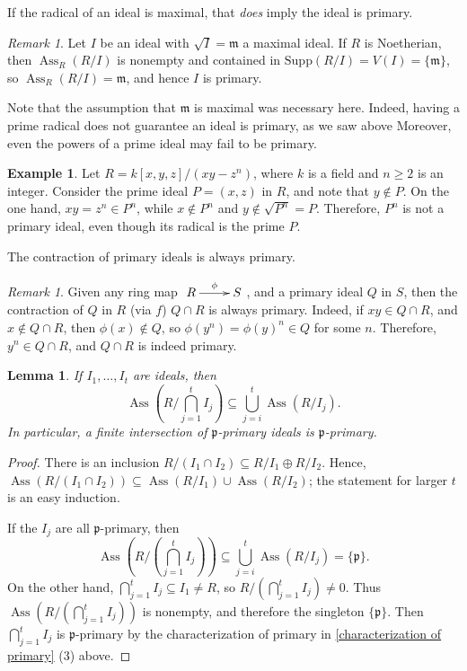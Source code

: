 \documentclass{amsart}[12pt]
\def\Ass{\operatorname{Ass}}
\newcommand{\p}{{\mathfrak p}}
\newcommand{\fm}{{\mathfrak m}}
\numberwithin{equation}{section}
\theoremstyle{plain} %
\newtheorem{lemma}[equation]{Lemma}
\theoremstyle{definition}
\newtheorem{example}[equation]{Example}
\theoremstyle{remark}
\newtheorem{remark}[equation]{Remark}
\newcommand{\Supp}{\mathrm{Supp}}
\begin{document}
If the radical of an ideal is maximal, that \emph{does} imply the ideal is primary.

\begin{remark} 
Let $I$ be an ideal with $\sqrt{I}=\fm$ a maximal ideal. If $R$ is Noetherian, then $\Ass_R(R/I)$ is nonempty and contained in $\Supp(R/I)=V(I)=\{\fm\}$, so $\Ass_R(R/I) =\fm$, and hence $I$ is primary.
\end{remark}

Note that the assumption that $\fm$ is maximal was necessary here. Indeed, having a prime radical does not guarantee an ideal is primary, as we saw above Moreover, even the powers of a prime ideal may fail to be primary.

\begin{example}\label{powers of prime not primary}
	Let $R = k[x,y,z]/(xy-z^n)$, where $k$ is a field and $n \geqslant 2$ is an integer. Consider the prime ideal $P = (x,z)$ in $R$, and note that $y \notin P$. On the one hand, $xy = z^n \in P^n$, while $x \notin P^n$ and $y \notin \sqrt{P^n} = P$. Therefore, $P^n$ is not a primary ideal, even though its radical is the prime $P$.
\end{example}


The contraction of primary ideals is always primary.

\begin{remark}\label{contraction of primary ideals is primary}
	 Given any ring map $\xymatrix{R \ar[r]^-\phi & S}$, and a primary ideal $Q$ in $S$, then the contraction of $Q$ in $R$ (via $f$) $Q \cap R$ is always primary. Indeed, if $xy \in Q \cap R$, and $x \notin Q \cap R$, then $\phi(x) \notin Q$, so $\phi(y^n) = \phi(y)^n \in Q$ for some $n$. Therefore, $y^n \in Q \cap R$, and $Q \cap R$ is indeed primary.
\end{remark}

\begin{lemma}\label{lemma intersections primary}
	If $I_1,\dots,I_t$ are ideals, then 
	$$\Ass \left( R/ \bigcap_{j=1}^t I_j \right) \subseteq \bigcup_{j=i}^t \Ass(R/I_j).$$ 
	In particular, a finite intersection of $\p$-primary ideals is $\p$-primary.
\end{lemma}
\begin{proof}
	There is an inclusion $R/(I_1 \cap I_2) \subseteq R/I_1 \oplus R/I_2$. Hence, $\Ass(R/(I_1\cap I_2)) \subseteq \Ass(R/I_1) \cup \Ass(R/I_2)$; the statement for larger $t$ is an easy induction.
	
	If the $I_j$ are all $\p$-primary, then
	$$\Ass(R/(\bigcap_{j=1}^t I_j)) \subseteq \bigcup_{j=i}^t \Ass(R/I_j) = \{ \p \}.$$
	On the other hand, $\bigcap_{j=1}^t I_j \subseteq I_1 \neq R$, so $R/(\bigcap_{j=1}^t I_j) \neq 0$. Thus $\Ass(R/(\bigcap_{j=1}^t I_j))$ is nonempty, and therefore the singleton $\{ \p \}$. Then $\bigcap_{j=1}^t I_j$ is $\p$-primary by the characterization of primary in \ref{characterization of primary} (3) above.
\end{proof}
\end{document}
